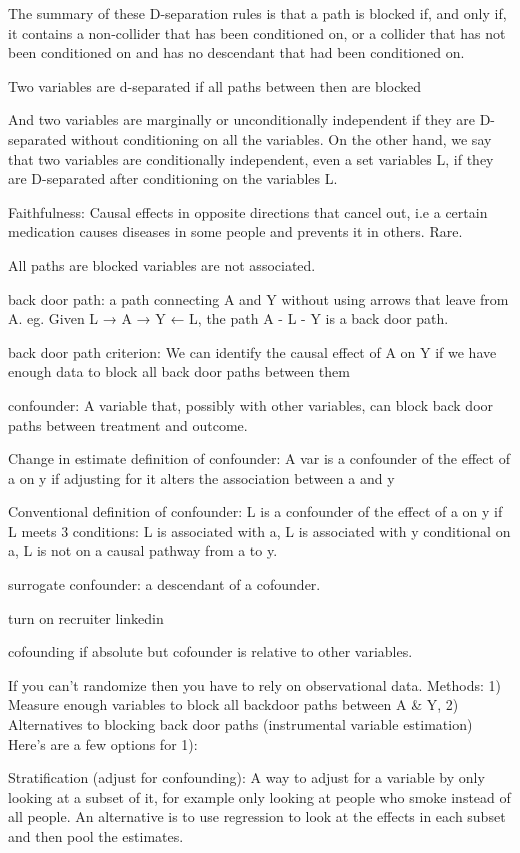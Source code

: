 \documentclass[]{book}
\begin{document}
The summary of these D-separation rules is that a path is blocked if,
and only if, it contains a non-collider that has been conditioned on, or
a collider that has not been conditioned on and has no descendant that
had been conditioned on.

Two variables are d-separated if all paths between then are blocked

And two variables are marginally or unconditionally independent if they
are D-separated without conditioning on all the variables. On the other
hand, we say that two variables are conditionally independent, even a
set variables L, if they are D-separated after conditioning on the
variables L.

Faithfulness: Causal effects in opposite directions that cancel out, i.e
a certain medication causes diseases in some people and prevents it in
others. Rare.

All paths are blocked variables are not associated.

back door path: a path connecting A and Y without using arrows that
leave from A. eg. Given L → A → Y ← L, the path A - L - Y is a back door
path.

back door path criterion: We can identify the causal effect of A on Y if
we have enough data to block all back door paths between them

confounder: A variable that, possibly with other variables, can block
back door paths between treatment and outcome.

Change in estimate definition of confounder: A var is a confounder of
the effect of a on y if adjusting for it alters the association between
a and y

Conventional definition of confounder: L is a confounder of the effect
of a on y if L meets 3 conditions: L is associated with a, L is
associated with y conditional on a, L is not on a causal pathway from a
to y.

surrogate confounder: a descendant of a cofounder.

turn on recruiter linkedin

cofounding if absolute but cofounder is relative to other variables.

If you can't randomize then you have to rely on observational data.
Methods: 1) Measure enough variables to block all backdoor paths between
A \& Y, 2) Alternatives to blocking back door paths (instrumental
variable estimation) Here's are a few options for 1):

Stratification (adjust for confounding): A way to adjust for a variable
by only looking at a subset of it, for example only looking at people
who smoke instead of all people. An alternative is to use regression to
look at the effects in each subset and then pool the estimates.
\end{document}

